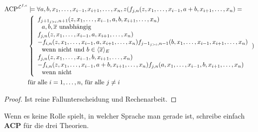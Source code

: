 \begin{lemma}
\begin{align*}
    	\operatorname{ACP}^{\mathcal{L}^{f,c}}&\models\forall a,b,x_1,\dots,x_{i-1},x_{i+1},\dots,x_n,z(f_{j,n}(z,x_1,\dots,x_{i-1},a+b,x_{i+1},\dots,x_n)=\\
    	&\left\{\begin{array}{ll}
    	f_{j+1_{j>i},n+1}(z,x_1,\dots,x_{i-1},a,b,x_{i+1},\dots,x_n)\\
    	\ \ a,b,\overline{x}\text{ unabhängig}\\
    	f_{j,n}(z,x_1,\dots,x_{i-1},a,x_{i+1},\dots,x_n)\\
    	-f_{i,n}(z,x_1,\dots,x_{i-1},a,x_{i+1},\dots,x_n)f_{j-1_{j>i},n-1}(b,x_1,\dots,x_{i-1},x_{i+1},\dots,x_n)\\
    	\ \ \text{wenn nicht und }b\in\langle\overline{x}\rangle_E\\
    	f_{j,n}(z,x_1,\dots,x_{i-1},b,x_{i+1},\dots,x_n)\\
    	-f_{i,n}(z,x_1,\dots,x_{i-1},a+b,x_{i+1},\dots,x_n)f_{j,n}(a,x_1,\dots,x_{i-1},b,x_{i+1},\dots,x_n)\\
    	\ \ \text{wenn nicht}
    	\end{array}\right.)\\
    	&\text{für alle }i=1,\dots,n\text{, für alle }j\neq i\\
    	\end{align*}
    \end{lemma}
    \begin{proof}
    	Ist reine Fallunterscheidung und Rechenarbeit.
    \end{proof}

    \begin{definition}
    Wenn es keine Rolle spielt, in welcher Sprache man gerade ist, schreibe einfach \textbf{ACP} für die drei Theorien.
    \end{definition}
    
